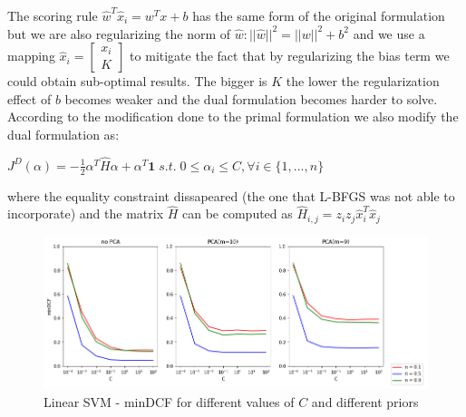 \documentclass[10pt, a4paper, twocolumn]{article} %
\begin{document}
The scoring rule $\hat{w}^T\hat{x}_i = w^Tx + b$ has the same form of the original formulation but
we are also regularizing the norm of $\hat{w}: ||\hat{w}||^2 = ||w||^2 + b^2$ and we use a mapping
$\hat{x}_i = \begin{bmatrix} x_i\\ K \end{bmatrix}$ to mitigate the fact that by regularizing  the bias
term we could obtain sub-optimal results. The bigger is $K$ the lower the regularization effect of $b$
becomes weaker and the dual formulation becomes harder to solve. According to the modification done to
the primal formulation we also modify the dual formulation as:
\begin{center}
	\begin{math}
		J^D(\alpha)=-\frac{1}{2}\alpha^T\hat{H}\alpha + \alpha^T\textbf{1} \; s.t.\; 0 \le \alpha_i \le C, \forall i\in \{1,...,n\}
	\end{math}
\end{center}
where the equality constraint dissapeared (the one that L-BFGS was not able to incorporate) and the
matrix $\hat{H}$ can be computed as $\hat{H}_{i,j}=z_iz_j\hat{x}_i^T\hat{x}_j$
\begin{figure}[ht!]
	\includegraphics[width=\linewidth]{./Pictures/FeaturesAnalysis/LSVM.png}
	\caption{Linear SVM - minDCF for different values of $C$ and different priors}
	\label{lsvm} 
\end{figure}
\end{document}
